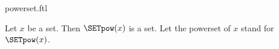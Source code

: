 \documentclass{stex}
\begin{document}
\begin{smodule}{powerset.ftl}


\begin{axiom}[forthel,title=Powerset,name=Powerset Axiom]
  Let $x$ be a set.
  Then $\SETpow(x)$ is a set.
  Let the powerset of $x$ stand for $\SETpow(x)$.
\end{axiom}
\end{smodule}
\end{document}
